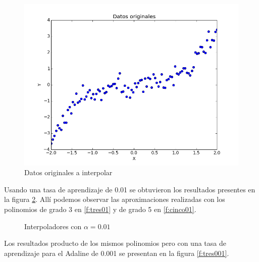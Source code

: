 \documentclass[a4paper]{article}
\begin{document}
	\begin{figure}[H]
	\centering
	\includegraphics[scale=0.3]{interpolado.png}
	\caption{Datos originales a interpolar}
	\label{fig:interpolador}
	\end{figure}
	
	Usando una tasa de aprendizaje de 0.01 se obtuvieron los resultados presentes en la figura \ref{f:interpolado01}. Allí podemos observar las aproximaciones realizadas con los polinomios de grado 3 en \ref{f:tres01} y de grado 5 en \ref{f:cinco01}.
	
	\begin{figure}[H]
	\centering
	\caption{Interpoladores con $\alpha = 0.01$}
	\label{f:interpolado01}
	\end{figure}	
	
	Los resultados producto de los mismos polinomios pero con una tasa de aprendizaje para el Adaline de 0.001 se presentan en la figura \ref{f:tres001}.
	
\end{document}
